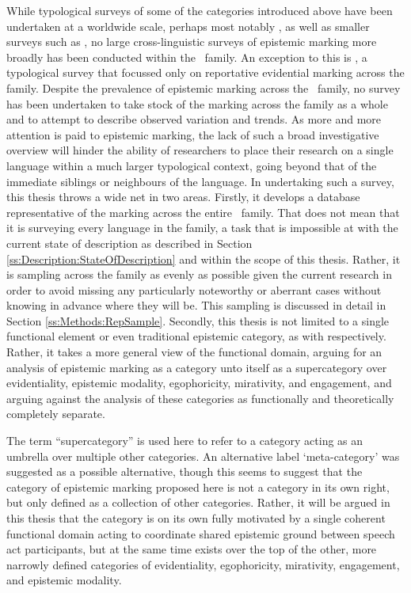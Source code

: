 While typological surveys of some of the categories introduced above have been undertaken at a worldwide scale, perhaps most notably , as well as smaller surveys such as , no large cross-linguistic surveys of epistemic marking more broadly has been conducted within the \lfam\ family. An exception to this is , a typological survey that focussed only on reportative evidential marking across the family. Despite the prevalence of epistemic marking across the \lfam\ family, no survey has been undertaken to take stock of the marking across the family as a whole and to attempt to describe observed variation and trends. As more and more attention is paid to epistemic marking, the lack of such a broad investigative overview will hinder the ability of researchers to place their research on a single language within a much larger typological context, going beyond that of the immediate siblings or neighbours of the language. In undertaking such a survey, this thesis throws a wide net in two areas. Firstly, it develops a database representative of the marking across the entire \lfam\ family. That does not mean that it is surveying every language in the family, a task that is impossible at with the current state of description as described in Section \ref{ss:Description:StateOfDescription} and within the scope of this thesis. Rather, it is sampling across the family as evenly as possible given the current research in order to avoid missing any particularly noteworthy or aberrant cases without knowing in advance where they will be. This sampling is discussed in detail in Section \ref{ss:Methods:RepSample}. Secondly, this thesis is not limited to a single functional element or even traditional epistemic category, as with  respectively. Rather, it takes a more general view of the functional domain, arguing for an analysis of epistemic marking as a category unto itself as a supercategory over evidentiality, epistemic modality, egophoricity, mirativity, and engagement, and arguing against the analysis of these categories as functionally and theoretically completely separate.

The term ``supercategory'' is used here to refer to a category acting as an umbrella over multiple other categories. An alternative label `meta-category' was suggested as a possible alternative, though this seems to suggest that the category of epistemic marking proposed here is not a category in its own right, but only defined as a collection of other categories. Rather, it will be argued in this thesis that the category is on its own fully motivated by a single coherent functional domain acting to coordinate shared epistemic ground between speech act participants, but at the same time exists over the top of the other, more narrowly defined categories of evidentiality, egophoricity, mirativity, engagement, and epistemic modality.

